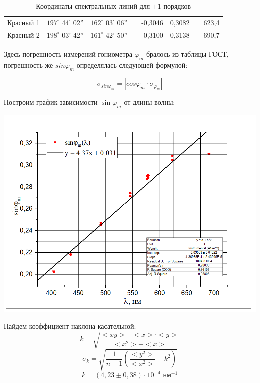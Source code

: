 \documentclass[a4paper,12pt]{report}
\begin{document}
\begin{table}[H]
\begin{tabular}{|c|cc|c|cc|c|c|}
Красный 1             & \multicolumn{1}{c|}{$197^{\circ}$ 44' 02''} & $162^{\circ}$ 03' 06'' &                           & \multicolumn{1}{c|}{-0,3046}     & 0,3082     &                                & 623,4                                   \\ \cline{1-3} \cline{5-6} \cline{8-8} 
Красный 2             & \multicolumn{1}{c|}{$198^{\circ}$ 03' 42''} & $161^{\circ}$ 42' 50'' &                           & \multicolumn{1}{c|}{-0,3100}     & 0,3138     &                                & 690,7                                   \\ \hline
\end{tabular}
\caption{Координаты спектральных линий для $\pm 1$ порядков}
\end{table}
Здесь погрешность измерений гониометра $\varphi_{m}$ бралось из таблицы ГОСТ, погрешность же $sin \varphi_{m}$ определялась следующей формулой:

\begin{equation*}
    \sigma_{sin \varphi_{m}} = |cos\varphi_{m}\cdot \sigma_{\varphi_{m}}|
\end{equation*}

Построим график зависимости $\sin{\varphi_{m}}$ от длины волны:
\begin{center}
    \includegraphics[width = \linewidth]{sin(lambda).png}
\end{center}

Найдем коэффициент наклона касательной:
\begin{equation*}
    k = \sqrt{\frac{<xy>-<x>\cdot<y>}{<x^2>-<x>}}
\end{equation*}
\begin{equation*}
    \sigma_k = \sqrt{\frac{1}{n-1}(\frac{<y^2>}{<x^2>}-k^2)}
\end{equation*}
\begin{equation*}
    k = (4,23\pm 0,38) \cdot 10^{-4} \text{ нм}^{-1} 
\end{equation*}
\end{document}
